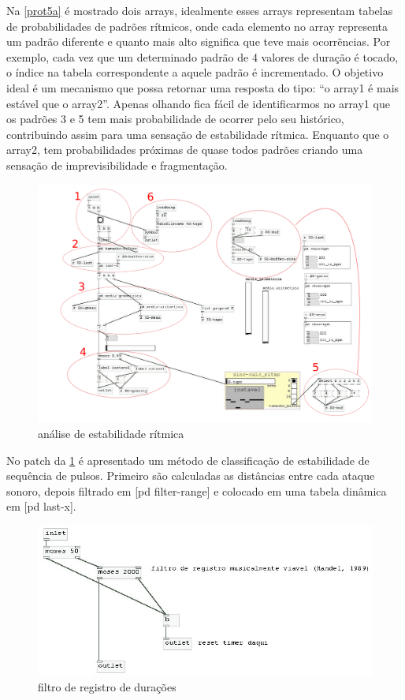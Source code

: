 \documentclass{ppgmus}
\begin{document}
Na \ref{prot5a} é mostrado dois arrays, idealmente esses arrays representam tabelas
de probabilidades de padrões rítmicos, onde cada elemento no array representa um
padrão diferente e quanto mais alto significa que teve mais ocorrẽncias.
Por exemplo, cada vez que um determinado padrão de 4 valores de duração é tocado, 
o índice na tabela correspondente a aquele padrão é incrementado. O objetivo ideal
é um mecanismo que possa retornar uma resposta do tipo:
``o array1 é mais estável que o array2''. Apenas olhando fica fácil de identificarmos
no array1 que os padrões 3 e 5 tem mais probabilidade de ocorrer pelo seu histórico,
contribuindo assim para uma sensação de estabilidade rítmica. Enquanto que o array2,
tem probabilidades próximas de quase todos padrões criando uma sensação de imprevisibilidade
e fragmentação.


\begin{figure}
\includegraphics[scale=.5]{sinc-calc-ritmo}
\caption{análise de estabilidade rítmica}
\label{[sinc-calc-ritmo]}
\end{figure}

No patch da \ref{[sinc-calc-ritmo]} é apresentado um método de classificação de estabilidade
de sequência de pulsos. Primeiro são calculadas as distâncias entre cada ataque
sonoro, depois filtrado em [pd filter-range] e colocado em uma tabela dinâmica em
[pd last-x]. 


\begin{figure}
\includegraphics[scale=.6]{sinc-calc-ritmo1}
\caption{filtro de registro de durações}
\label{[sinc-calc-ritmo1]}
\end{figure}
\end{document}
